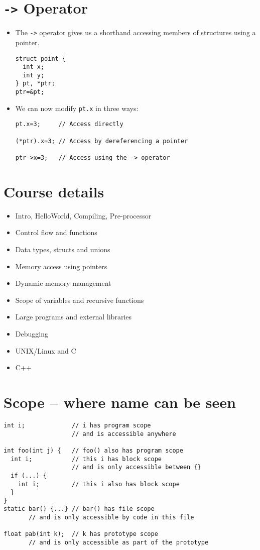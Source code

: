 \documentclass{article}
\begin{document}
\section{\texttt{->} Operator}
\begin{itemize}
\item The \verb!->! operator gives us a shorthand accessing members of structures using a pointer.
\begin{verbatim}
struct point {
  int x;
  int y;
} pt, *ptr;
ptr=&pt;
\end{verbatim}

\item We can now modify \verb!pt.x! in three ways:

\begin{verbatim}
pt.x=3;     // Access directly

(*ptr).x=3; // Access by dereferencing a pointer

ptr->x=3;   // Access using the -> operator
\end{verbatim}
\end{itemize}



\section{Course details}
\begin{itemize}
\item Intro, HelloWorld, Compiling, Pre-processor
\item Control flow and functions
\item Data types, structs and unions
\item Memory access using pointers
\item Dynamic memory management
\item Scope of variables and recursive functions
\item Large programs and external libraries
\item Debugging
\item UNIX/Linux and C
\item C++
\end{itemize}



\section{Scope -- where name can be seen}
\begin{verbatim}
int i;             // i has program scope
                   // and is accessible anywhere

int foo(int j) {   // foo() also has program scope
  int i;           // this i has block scope
                   // and is only accessible between {}
  if (...) {
    int i;         // this i also has block scope
  }
}
static bar() {...} // bar() has file scope
       // and is only accessible by code in this file

float pab(int k);  // k has prototype scope
       // and is only accessible as part of the prototype
\end{verbatim}
\end{document}

